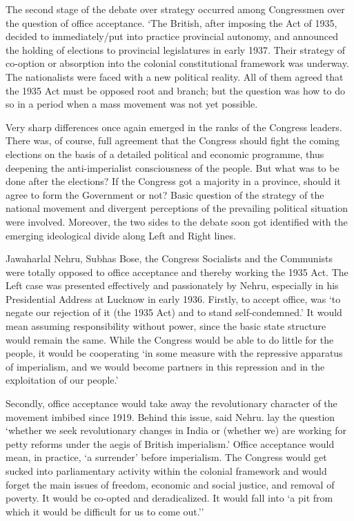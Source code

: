 \begin{multicols}{2}
The second stage of the debate over strategy occurred among Congressmen over the question of office acceptance. `The British, after imposing the Act of 1935, decided to immediately/put into practice provincial autonomy, and announced the holding of elections to provincial legislatures in early 1937. Their strategy of co-option or absorption into the colonial constitutional framework was underway. The nationalists were faced with a new political reality. All of them agreed that the 1935 Act must be opposed root and branch; but the question was how to do so in a period when a mass movement was not yet possible. 

Very sharp differences once again emerged in the ranks of the Congress leaders. There was, of course, full agreement that the Congress should fight the coming elections on the basis of a detailed political and economic programme, thus deepening the anti-imperialist consciousness of the people. But what was to be done after the elections? If the Congress got a majority in a province, should it agree to form the Government or not? Basic question of the strategy of the national movement and divergent perceptions of the prevailing political situation were involved. Moreover, the two sides to the debate soon got identified with the emerging ideological divide along Left and Right lines. 

Jawaharlal Nehru, Subhas Bose, the Congress Socialists and the Communists were totally opposed to office acceptance and thereby working the 1935 Act. The Left case was presented effectively and passionately by Nehru, especially in his Presidential Address at Lucknow in early 1936. Firstly, to accept office, was `to negate our rejection of it (the 1935 Act) and to stand self-condemned.' It would mean assuming responsibility without power, since the basic state structure would remain the same. While the Congress would be able to do little for the people, it would be cooperating `in some measure with the repressive apparatus of imperialism, and we would become partners in this repression and in the exploitation of our people.' 

Secondly, office acceptance would take away the revolutionary character of the movement imbibed since 1919. Behind this issue, said Nehru. lay the question `whether we seek revolutionary changes in India or (whether we) are working for petty reforms under the aegis of British imperialism.' Office acceptance would mean, in practice, `a surrender' before imperialism. The Congress would get sucked into parliamentary activity within the colonial framework and would forget the main issues of freedom, economic and social justice, and removal of poverty. It would be co-opted and deradicalized. It would fall into `a pit from which it would be difficult for us to come out.'' 


\end{multicols}

